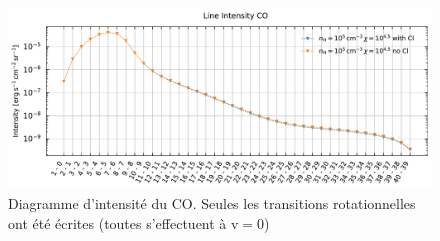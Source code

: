 \begin{appendices}
\begin{figure}[!h]
        \centering \includegraphics[trim = {0 0 0 1cm},clip,width=1\textwidth]{figure/Cl/gridModelEmiss/I_comp_CO.pdf}
        \caption{Diagramme d'intensité du $\mathrm{CO}$. Seules les transitions rotationnelles ont été écrites (toutes s'effectuent à $\mathrm{v}=0$)}
        \label{fig:cl:emiss:CO}
\end{figure}



\end{appendices}
